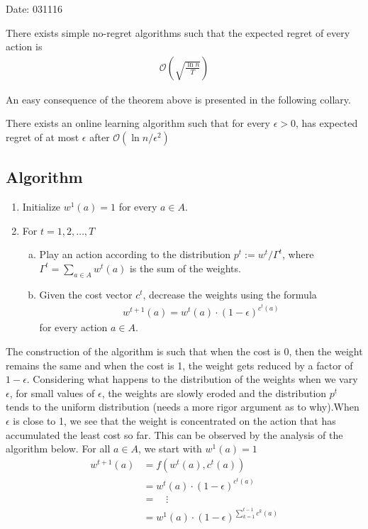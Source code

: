 \begin{flushright}
Date: 031116
\end{flushright}



\begin{thm}
There exists simple no-regret algorithms such that the expected regret of every action is 
\begin{align*}
\mathcal{O}\left(\sqrt{\frac{\ln n}{T}}\right)
\end{align*}
\end{thm}
An easy consequence of the theorem above is presented in the following collary.
\begin{cor}
There exists an online learning algorithm such that for every $\epsilon >0$, has expected regret of at most $\epsilon$ after $\mathcal{O}\left(\ln n/\epsilon^2\right)$
\end{cor}

\subsection{Algorithm}
\begin{enumerate}
\item Initialize $w^1(a)=1$ for every $a \in A$.
\item For $t=1,2,\ldots, T$
\begin{enumerate}[(a)]
\item Play an action according to the distribution $p^t:=w^t/\Gamma^t$, where $\Gamma^t=\sum_{a\in A}w^t(a)$ is the sum of the weights.
\item Given the cost vector $c^t$, decrease the weights using the formula 
\begin{align*}
w^{t+1}(a)=w^t(a)\cdot (1-\epsilon)^{c^t(a)}
\end{align*}
for every action $a \in A$.


\end{enumerate}
\end{enumerate}

The construction of the algorithm is such that when the cost is 0, then the weight remains the same and when the cost is 1, the weight gets reduced by a factor of $1-\epsilon$. Considering what happens to the distribution of the weights when we vary $\epsilon$, for small values of $\epsilon$, the weights are slowly eroded and the distribution $p^t$ tends to the uniform distribution (needs a more rigor argument as to why).When $\epsilon$ is close to 1, we see that the weight is concentrated on the action that has accumulated the least cost so far. This can be observed by the analysis of the algorithm below. For all $a \in A$, we start with $w^1(a)=1$
\begin{align*}
w^{t+1}(a)&= f(w^t(a),c^t(a))\\
&= w^t(a)\cdot(1-\epsilon)^{c^t(a)}\\
&=\quad\vdots\\
&= w^1(a)\cdot (1-\epsilon)^{\sum_{k=1}^{t-1}c^k(a)}
\end{align*}


